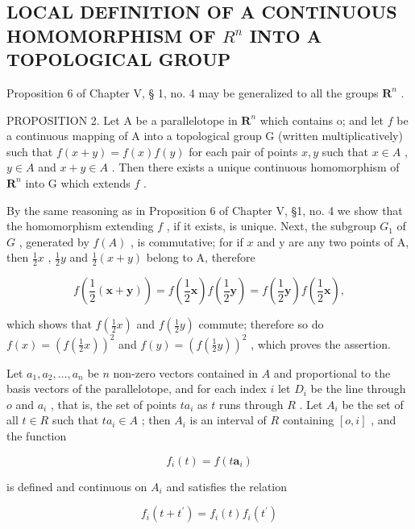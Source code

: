 \subsection{\texorpdfstring{LOCAL DEFINITION OF A CONTINUOUS HOMOMORPHISM OF \(R^{n}\) INTO A TOPOLOGICAL GROUP}{LOCAL DEFINITION OF A CONTINUOUS HOMOMORPHISM OF R TO THE N INTO A TOPOLOGICAL GROUP}}

Proposition 6 of Chapter V, § 1, no. 4 may be generalized to all the groups \(\mathbf{R}^n\) .

PROPOSITION 2. Let A be a parallelotope in \(\mathbf{R}^n\) which contains o; and let \(f\) be a continuous mapping of A into a topological group G (written multiplicatively) such that \(f(x + y) = f(x)f(y)\) for each pair of points \(x, y\) such that \(x \in A\) , \(y \in A\) and \(x + y \in A\) . Then there exists a unique continuous homomorphism of \(\mathbf{R}^n\) into G which extends \(f\) .

By the same reasoning as in Proposition 6 of Chapter V, §1, no. 4 we show that the homomorphism extending \(f\) , if it exists, is unique. Next, the subgroup \(G_1\) of \(G\) , generated by \(f(A)\) , is commutative; for if \(x\) and y are any two points of A, then \(\frac{1}{2}x\) , \(\frac{1}{2}y\) and \(\frac{1}{2}(x+y)\) belong to A, therefore

\[
f \left(\frac {1}{2} (\boldsymbol {x} + \boldsymbol {y})\right) = f \left(\frac {1}{2} \boldsymbol {x}\right) f \left(\frac {1}{2} \boldsymbol {y}\right) = f \left(\frac {1}{2} \boldsymbol {y}\right) f \left(\frac {1}{2} \boldsymbol {x}\right),
\]

which shows that \(f(\frac{1}{2} x)\) and \(f(\frac{1}{2} y)\) commute; therefore so do \(f(x) = (f(\frac{1}{2} x))^2\) and \(f(y) = (f(\frac{1}{2} y))^2\) , which proves the assertion.

Let \(a_1, a_2, \ldots, a_n\) be \(n\) non-zero vectors contained in \(A\) and proportional to the basis vectors of the parallelotope, and for each index \(i\) let \(D_i\) be the line through \(o\) and \(a_i\) , that is, the set of points \(ta_i\) as \(t\) runs through \(R\) . Let \(A_i\) be the set of all \(t \in R\) such that \(ta_i \in A\) ; then \(A_i\) is an interval of \(R\) containing \([o, i]\) , and the function

\[
f _ {i} (t) = f \left(t \boldsymbol {a} _ {i}\right)
\]

is defined and continuous on \(A_{i}\) and satisfies the relation

\[
f _ {i} (t + t ^ {\prime}) = f _ {i} (t) f _ {i} (t ^ {\prime})
\]

